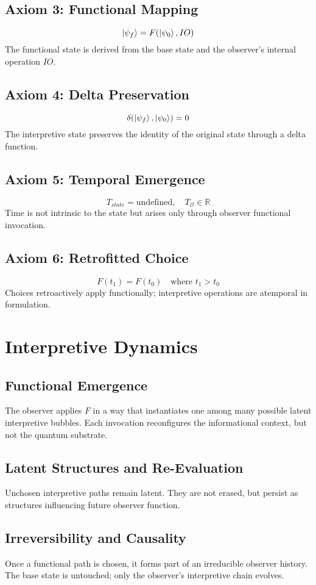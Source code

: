 \documentclass[12pt]{article}
\begin{document}
\subsection*{Axiom 3: Functional Mapping}
\[ \ket{\psi_f} = F(\ket{\psi_0}, IO) \]
The functional state is derived from the base state and the observer's internal operation $IO$.

\subsection*{Axiom 4: Delta Preservation}
\[ \delta(\ket{\psi_f}, \ket{\psi_0}) = 0 \]
The interpretive state preserves the identity of the original state through a delta function.

\subsection*{Axiom 5: Temporal Emergence}
\[ T_{state} = \text{undefined}, \quad T_\mathcal{O} \in \mathbb{R} \]
Time is not intrinsic to the state but arises only through observer functional invocation.

\subsection*{Axiom 6: Retrofitted Choice}
\[ F(t_1) = F(t_0) \quad \text{where } t_1 > t_0 \]
Choices retroactively apply functionally; interpretive operations are atemporal in formulation.

\section{Interpretive Dynamics}
\subsection{Functional Emergence}
The observer applies $F$ in a way that instantiates one among many possible latent interpretive bubbles. Each invocation reconfigures the informational context, but not the quantum substrate.

\subsection{Latent Structures and Re-Evaluation}
Unchosen interpretive paths remain latent. They are not erased, but persist as structures influencing future observer function.

\subsection{Irreversibility and Causality}
Once a functional path is chosen, it forms part of an irreducible observer history. The base state is untouched; only the observer's interpretive chain evolves.
\end{document}
